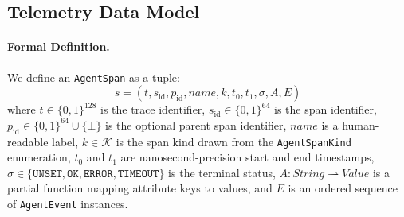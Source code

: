 \documentclass[sigconf,nonacm]{acmart}
\begin{document}
\subsection{Telemetry Data Model}
\label{sec:datamodel}

\paragraph{Formal Definition.}
We define an \texttt{AgentSpan} as a tuple:
\[
  s = (t, s_{\mathrm{id}}, p_{\mathrm{id}}, \mathit{name}, k, t_0, t_1, \sigma, A, E)
\]
where $t \in \{0,1\}^{128}$ is the trace identifier, $s_{\mathrm{id}} \in \{0,1\}^{64}$ is the span identifier, $p_{\mathrm{id}} \in \{0,1\}^{64} \cup \{\bot\}$ is the optional parent span identifier, $\mathit{name}$ is a human-readable label, $k \in \mathcal{K}$ is the span kind drawn from the \texttt{AgentSpanKind} enumeration, $t_0$ and $t_1$ are nanosecond-precision start and end timestamps, $\sigma \in \{\texttt{UNSET}, \texttt{OK}, \texttt{ERROR}, \texttt{TIMEOUT}\}$ is the terminal status, $A : \mathit{String} \rightharpoonup \mathit{Value}$ is a partial function mapping attribute keys to values, and $E$ is an ordered sequence of \texttt{AgentEvent} instances.
\end{document}
